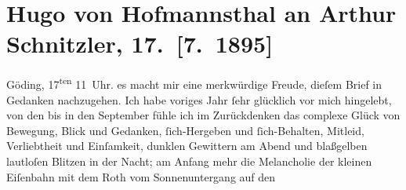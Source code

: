 

         
         \renewcommand{\erwaehntePersonen}{Personen: Richard Beer-Hofmann, Paul Goldmann, Edgar von Karg-Bebenburg, Felix Salten}
         \renewcommand{\erwaehnteOrte}{Orte: Bad Ischl, Hodonín, Hotel und Pension Rudolfshöhe (Leopold Petter), Salesianergasse, Salzburg}
         \renewcommand{\erwaehnteWerke}{Werke: Pan}
               \section[Hugo von Hofmannsthal an Arthur Schnitzler, 17. {[}7. 1895{]}]{ Hugo von Hofmannsthal an Arthur Schnitzler, 17. {[}7. 1895{]}}\nopagebreak{}\rehead{ }\begin{ledgroupsized}[t]{13cm}\normalsize\beginnumbering \toendnotes[C]{\smallbreak\pagebreak[2]} 
\toendnotes[C]{\smallbreak}\pstart
           \raggedleft{}{\pb}Göding, 17\textsuperscript{ten}{ }11 Uhr. \pend
           \pstart
           \raggedleft{}\textcolor{gray}{\textbf{}}\pend
           \pstart
           es macht mir eine merkwürdige Freude, dieſem Brief in Gedanken nachzugehen. Ich habe
               voriges Jahr ſehr glücklich vor mich hingelebt, von den \label{K_L00464-1v}\label{K_L00464-1h} bis in den September
               fühle ich im Zurückdenken das complexe Glück von Bewegung, Blick und Gedanken,
               ſich-Hergeben und ſich-Behalten, Mitleid, Verliebtheit und Einſamkeit, dunklen
               Gewittern am Abend und blaßgelben lautloſen Blitzen in der Nacht; am Anfang mehr die
               Melancholie der kleinen Eiſenbahn mit dem Roth vom Sonnenuntergang auf den

\end{ledgroupsized}
